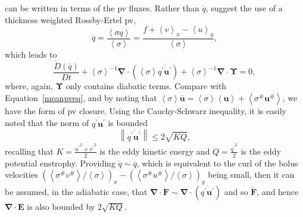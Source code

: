 \documentclass[12pt,a4paper]{report}
\newcommand*\thkmean[1]{\overline{#1}}
\newcommand*\thkres[1]{{#1}^{\prime}}
\newcommand*\nthkmean[1]{\left\langle{#1}\right\rangle}
\newcommand*\nthkres[1]{{#1}^{\#}}
\newcommand*\spec[1]{\mathring{#1}}
\newcommand*\equref[1]{Equation~\eqref{#1}}
\begin{document}
                      can be written in terms of the \gls{pv} fluxes.
                      Rather than $\spec{q}$, \cite{greatbatch1998exploring} suggest
                      the use of a thickness weighted Rossby-Ertel \gls{pv},
                      \begin{equation}
                      \thkmean{q}=\frac{\nthkmean{\sigma q}}{\nthkmean{\sigma}}=\frac{f+\nthkmean{v}_{x}-\nthkmean{u}_{y}}{\nthkmean{\sigma}},
                      \end{equation}
                      which leads  to
                      \begin{equation}
                      \frac{\spec{D} \left( \thkmean{q}\right)}{D t}
                      + \nthkmean{\sigma}^{-1}\boldsymbol{\nabla}\cdot\left(\nthkmean{\sigma}\thkmean{\thkres{q} \thkres{\boldsymbol{u}}}\right)
                      +\nthkmean{\sigma}^{-1}\boldsymbol{\nabla}\cdot\boldsymbol{\Upsilon}=0 ,
                      \end{equation}
                      where, again, $\boldsymbol{\Upsilon}$ only contains
                      diabatic terms. Compare with \equref{meanpveq}, and by noting that
                       ${\nthkmean{\sigma}\thkmean{\boldsymbol{u}}=\nthkmean{\sigma}\nthkmean{\boldsymbol{u}} + \nthkmean{\nthkres{\sigma}\nthkres{\boldsymbol{u}}}}$, we have the 
                       \cite{greatbatch1998exploring} form of \gls{pv} closure.
                       Using the Cauchy-Schwarz inequality, it is easily noted that
                       the norm of $\thkmean{\thkres{q} \thkres{\boldsymbol{u}}}$ is bounded
                       \begin{equation}
                       \left\|\thkmean{\thkres{q} \thkres{\boldsymbol{u}}}\right\|
                       \leq 2\sqrt{KQ},
                       \end{equation}
                       recalling that $K = \frac{\thkmean{{\thkres{u}}^{2} +
                       	{\thkres{v}}^{2}}}{2}$ is the eddy kinetic energy and $Q =
                        \frac{\thkmean{{\thkres{q}}^{2}}}{2}$ is the eddy potential enstrophy.
                       Providing $\spec{q} \sim \thkmean{q}$, which is equivalent 
                       to the  curl of the bolus velocities $\left(\nthkmean{\nthkres{\sigma}\nthkres{v}}/\nthkmean{\sigma}\right)_{x}-\left(\nthkmean{\nthkres{\sigma}\nthkres{u}}/\nthkmean{\sigma}\right)_{y}$ 
                       being small, then it can be assumed, in the adiabatic case,
                       that $\boldsymbol{\nabla}\cdot\spec{\boldsymbol{F}} \sim \boldsymbol{\nabla}\cdot\left(\thkmean{\thkres{q} \thkres{\boldsymbol{u}}}\right)$ and so $\spec{\boldsymbol{F}}$,
                       and hence $\boldsymbol{\nabla}\cdot\boldsymbol{E}$
                       is also bounded by  $2\sqrt{KQ}$.
                       
\end{document}
